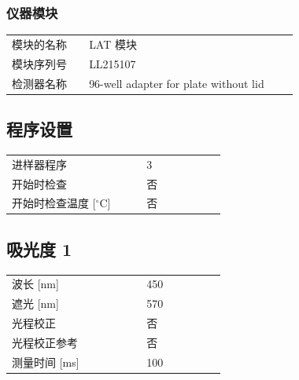\documentclass[UTF8,10pt,a4paper,fontset=fandol]{ctexart}
\newcommand{\fieldvalue}[1]{#1}
\begin{document}
\subsubsection*{仪器模块}

\begin{tabular}{@{}p{0.24\linewidth}p{0.65\linewidth}@{}}
模块的名称 &
\fieldvalue{LAT 模块}
\\
模块序列号 &
\fieldvalue{LL215107}
\\
检测器名称 &
\fieldvalue{96-well adapter for plate without lid}
\\
\end{tabular}

\subsection*{程序设置}

\begin{tabular}{@{}p{0.34\linewidth}p{0.20\linewidth}@{}}
进样器程序 &
\fieldvalue{3}
\\
开始时检查 &
\fieldvalue{否}
\\
开始时检查温度 [$^\circ$C] &
\fieldvalue{否}
\\
\end{tabular}

\subsection*{吸光度 1}

\begin{tabular}{@{}p{0.34\linewidth}p{0.20\linewidth}@{}}
波长 [nm] &
\fieldvalue{450}
\\
遮光 [nm] &
\fieldvalue{570}
\\
光程校正 &
\fieldvalue{否}
\\
光程校正参考 &
\fieldvalue{否}
\\
测量时间 [ms] &
\fieldvalue{100}
\\
\end{tabular}
\end{document}
